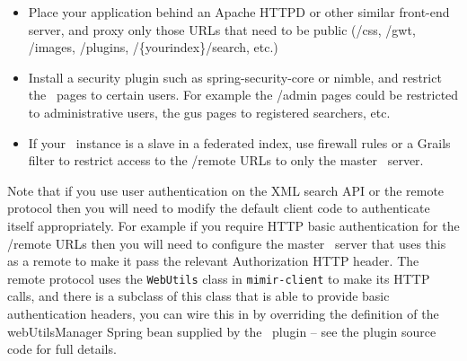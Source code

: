 \begin{itemize}
\item Place your application behind an Apache HTTPD or other similar front-end
  server, and proxy only those URLs that need to be public (/css, /gwt,
  /images, /plugins, /\{yourindex\}/search, etc.)
\item Install a security plugin such as spring-security-core or nimble, and
  restrict the \Mimir\ pages to certain users.  For example the /admin pages
  could be restricted to administrative users, the gus pages to registered
  searchers, etc.
\item If your \Mimir\ instance is a slave in a federated index, use firewall
  rules or a Grails filter to restrict access to the /remote URLs to only the
  master \Mimir\ server.
\end{itemize}

Note that if you use user authentication on the XML search API or the remote
protocol then you will need to modify the default client code to authenticate
itself appropriately.  For example if you require HTTP basic authentication for
the /remote URLs then you will need to configure the master \Mimir\ server that
uses this as a remote to make it pass the relevant Authorization HTTP header.
The remote protocol uses the {\tt WebUtils} class in {\tt mimir-client} to make
its HTTP calls, and there is a subclass of this class that is able to provide
basic authentication headers, you can wire this in by overriding the definition
of the webUtilsManager Spring bean supplied by the \Mimir\ plugin -- see the
plugin source code for full details.
